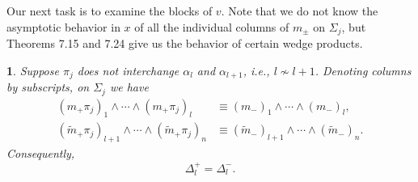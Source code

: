 \documentclass{surv-l}
\theoremstyle{plain}
\newtheorem{lemma}[theorem]{\sc{Lemma}}
\theoremstyle{definition}
\numberwithin{equation}{chapter}
\begin{document}
Our next task is to examine the blocks of $v$. Note that we do not know the asymptotic behavior in $x$ of all the individual columns of $m_{\pm}$ on $\Sigma_{j}$, but Theorems 7.15 and 7.24 give us the behavior of certain wedge products.
\setcounter{theorem}{12}
\begin{lemma}\label{lam12.13}
Suppose $\pi_{j}$ does not interchange $\alpha_{l}$ and $\alpha_{l+1}$, i.e., $l\nsim l+1$. Denoting columns by subscripts, on $\Sigma_{j}$ we have
\setcounter{equation}{13}
\begin{align}\label{eq12.14}
(m_{+}\pi_{j})_{1}\wedge\cdots \wedge(m_{+}\pi_{j})_{l}&\equiv(m_{-})_{1}\wedge\cdots\wedge(m_{-})_{l},\\\label{eq12.15}
(\tilde{m}_{+}\pi_{j})_{l+1}\wedge\cdots \wedge(\tilde{m}_{+}\pi_{j})_{n}&\equiv(\tilde{m}_{-})_{l+1}\wedge\cdots \wedge(\tilde{m}_{-})_{n}.
\end{align}
Consequently,
\begin{equation}\label{eq12.16}
\Delta_{l}^{+}=\Delta_{l}^{-}.
\end{equation}
\end{lemma}
\end{document}
